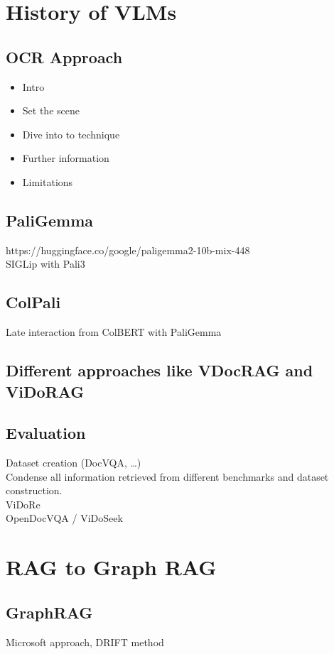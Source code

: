 \documentclass[12pt,twoside]{report}
\begin{document}
\section{History of VLMs}

\subsection{OCR Approach}
\begin{itemize}
\item Intro
\item Set the scene
\item Dive into to technique
\item Further information
\item Limitations
\end{itemize}

\subsection{PaliGemma}
https://huggingface.co/google/paligemma2-10b-mix-448 \\
SIGLip with Pali3

\subsection{ColPali}
Late interaction from ColBERT with PaliGemma

\subsection{Different approaches like VDocRAG and ViDoRAG}

\subsection{Evaluation}
Dataset creation (DocVQA, …) \\
Condense all information retrieved from different benchmarks and dataset construction. \\
ViDoRe \\
OpenDocVQA / ViDoSeek

\section{RAG to Graph RAG}

\subsection{GraphRAG}
Microsoft approach, DRIFT method
\end{document}
